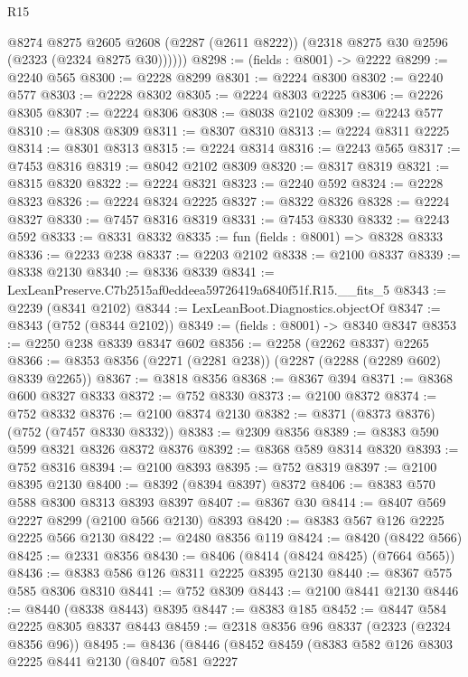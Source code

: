 \begin{lexlean}{R15}
\begin{coremodule}
        @8274
          @8275
          @2605
          @2608
          (@2287 (@2611 @8222))
          (@2318 @8275 @30 @2596 (@2323 (@2324 @8275 @30))))))
@8298 := (fields : @8001) -> @2222
@8299 := @2240 @565
@8300 := @2228 @8299
@8301 := @2224 @8300
@8302 := @2240 @577
@8303 := @2228 @8302
@8305 := @2224 @8303 @2225
@8306 := @2226 @8305
@8307 := @2224 @8306
@8308 := @8038 @2102
@8309 := @2243 @577
@8310 := @8308 @8309
@8311 := @8307 @8310
@8313 := @2224 @8311 @2225
@8314 := @8301 @8313
@8315 := @2224 @8314
@8316 := @2243 @565
@8317 := @7453 @8316
@8319 := @8042 @2102 @8309
@8320 := @8317 @8319
@8321 := @8315 @8320
@8322 := @2224 @8321
@8323 := @2240 @592
@8324 := @2228 @8323
@8326 := @2224 @8324 @2225
@8327 := @8322 @8326
@8328 := @2224 @8327
@8330 := @7457 @8316 @8319
@8331 := @7453 @8330
@8332 := @2243 @592
@8333 := @8331 @8332
@8335 := fun (fields : @8001) => @8328 @8333
@8336 := @2233 @238
@8337 := @2203 @2102
@8338 := @2100 @8337
@8339 := @8338 @2130
@8340 := @8336 @8339
@8341 := LexLeanPreserve.C7b2515af0eddeea59726419a6840f51f.R15.__fits_5
@8343 := @2239 (@8341 @2102)
@8344 := LexLeanBoot.Diagnostics.objectOf
@8347 := @8343 (@752 (@8344 @2102))
@8349 := (fields : @8001) -> @8340 @8347
@8353 := @2250 @238 @8339 @8347 @602
@8356 := @2258 (@2262 @8337) @2265
@8366 := @8353 @8356 (@2271 (@2281 @238)) (@2287 (@2288 (@2289 @602) @8339 @2265))
@8367 := @3818 @8356
@8368 := @8367 @394
@8371 := @8368 @600 @8327 @8333
@8372 := @752 @8330
@8373 := @2100 @8372
@8374 := @752 @8332
@8376 := @2100 @8374 @2130
@8382 := @8371 (@8373 @8376) (@752 (@7457 @8330 @8332))
@8383 := @2309 @8356
@8389 := @8383 @590 @599 @8321 @8326 @8372 @8376
@8392 := @8368 @589 @8314 @8320
@8393 := @752 @8316
@8394 := @2100 @8393
@8395 := @752 @8319
@8397 := @2100 @8395 @2130
@8400 := @8392 (@8394 @8397) @8372
@8406 := @8383 @570 @588 @8300 @8313 @8393 @8397
@8407 := @8367 @30
@8414 := @8407 @569 @2227 @8299 (@2100 @566 @2130) @8393
@8420 := @8383 @567 @126 @2225 @2225 @566 @2130
@8422 := @2480 @8356 @119
@8424 := @8420 (@8422 @566)
@8425 := @2331 @8356
@8430 := @8406 (@8414 (@8424 @8425) (@7664 @565))
@8436 := @8383 @586 @126 @8311 @2225 @8395 @2130
@8440 := @8367 @575 @585 @8306 @8310
@8441 := @752 @8309
@8443 := @2100 @8441 @2130
@8446 := @8440 (@8338 @8443) @8395
@8447 := @8383 @185
@8452 := @8447 @584 @2225 @8305 @8337 @8443
@8459 := @2318 @8356 @96 @8337 (@2323 (@2324 @8356 @96))
@8495 := @8436
    (@8446
      (@8452
        @8459
        (@8383
          @582
          @126
          @8303
          @2225
          @8441
          @2130
          (@8407
            @581
            @2227

\end{coremodule}
\end{lexlean}
